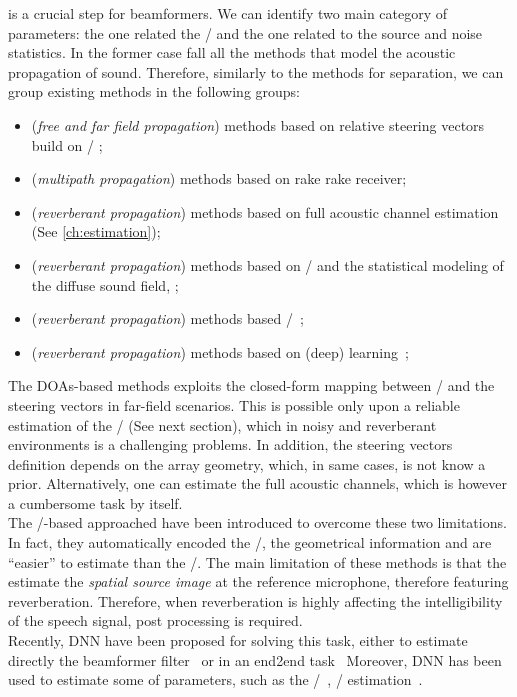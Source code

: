  is a crucial step for beamformers.
We can identify two main category of parameters: the one related the \RIRs/ and the one related to the source and noise statistics.
In the former case fall all the methods that model the acoustic propagation of sound.
Therefore, similarly to the methods for separation, we can group existing methods in the following groups:
\begin{itemize}
    \item (\textit{free and far field propagation}) methods based on relative steering vectors build on \DOA/ ;
    \item (\textit{multipath propagation}) methods based on rake rake receiver;
    \item (\textit{reverberant propagation}) methods based on full acoustic channel estimation (See \cref{ch:estimation});
    \item (\textit{reverberant propagation}) methods based on \DOAs/ and the statistical modeling of the diffuse sound field, ;
    \item (\textit{reverberant propagation}) methods based \ReTF/~;
    \item (\textit{reverberant propagation}) methods based on (deep) learning~;
\end{itemize}%
The \acp{DOA}-based methods exploits the closed-form mapping between \DOAs/ and the steering vectors in far-field scenarios.
This is possible only upon a reliable estimation of the \DOAs/ (See next section), which in noisy and reverberant environments is a challenging problems.
In addition, the steering vectors definition depends on the array geometry, which, in same cases, is not know a prior.
Alternatively, one can estimate the full acoustic channels, which is however a cumbersome task by itself.
\\The \ReTF/-based approached have been introduced to overcome these two limitations.
In fact, they automatically encoded the \RIRs/, the geometrical information and are ``easier'' to estimate than the \RIRs/.
The main limitation of these methods is that the estimate the \textit{spatial source image} at the reference microphone, therefore featuring reverberation.
Therefore, when reverberation is highly affecting the intelligibility of the speech signal, post processing is required.
\\Recently, \ac{DNN} have been proposed for solving this task, either to estimate directly the beamformer filter~ or in an end2end task~
Moreover, \ac{DNN} has been used to estimate some of parameters, such as the \DOAs/~, \ReTF/ estimation~.

